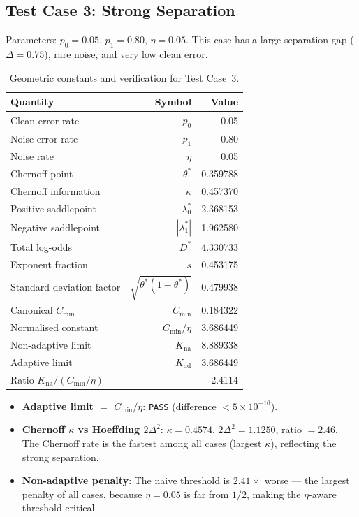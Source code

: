 \subsection{Test Case 3: Strong Separation}

Parameters: $p_0 = 0.05$, $p_1 = 0.80$, $\eta = 0.05$. This case has a large separation gap ($\Delta = 0.75$), rare noise, and very low clean error.

\begin{table}[htbp]
\centering
\caption{Geometric constants and verification for Test Case~3.}
\label{tab:case3}
\begin{tabular}{lrr}
\toprule
Quantity & Symbol & Value \\
\midrule
Clean error rate & $p_0$ & 0.05 \\
Noise error rate & $p_1$ & 0.80 \\
Noise rate & $\eta$ & 0.05 \\
Chernoff point & $\theta^*$ & 0.359788 \\
Chernoff information & $\kappa$ & 0.457370 \\
Positive saddlepoint & $\lambda_0^*$ & 2.368153 \\
Negative saddlepoint & $|\lambda_1^*|$ & 1.962580 \\
Total log-odds & $D^*$ & 4.330733 \\
Exponent fraction & $s$ & 0.453175 \\
Standard deviation factor & $\sqrt{\theta^*(1-\theta^*)}$ & 0.479938 \\
\midrule
Canonical $C_{\min}$ & $C_{\min}$ & 0.184322 \\
Normalised constant & $C_{\min}/\eta$ & 3.686449 \\
Non-adaptive limit & $K_{\mathrm{na}}$ & 8.889338 \\
Adaptive limit & $K_{\mathrm{ad}}$ & 3.686449 \\
Ratio $K_{\mathrm{na}} / (C_{\min}/\eta)$ & & 2.4114 \\
\bottomrule
\end{tabular}
\end{table}

\begin{itemize}
    \item\textbf{Adaptive limit $=$ $C_{\min}/\eta$}: \texttt{PASS} (difference $< 5 \times 10^{-16}$).
    \item\textbf{Chernoff $\kappa$ vs Hoeffding $2\Delta^2$}: $\kappa = 0.4574$, $2\Delta^2 = 1.1250$, ratio $= 2.46$. The Chernoff rate is the fastest among all cases (largest $\kappa$), reflecting the strong separation.
    \item\textbf{Non-adaptive penalty}: The naive threshold is $2.41\times$ worse --- the largest penalty of all cases, because $\eta = 0.05$ is far from $1/2$, making the $\eta$-aware threshold critical.
\end{itemize}

